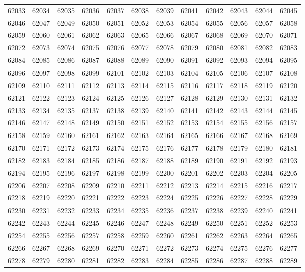 \begin{center}
\begin{longtable}{llllllllllll}
62033 &62034 &62035 &62036 &62037 &62038 &62039 &62041 &62042 &62043 &62044 &62045 \\
62046 &62047 &62049 &62050 &62051 &62052 &62053 &62054 &62055 &62056 &62057 &62058 \\
62059 &62060 &62061 &62062 &62063 &62065 &62066 &62067 &62068 &62069 &62070 &62071 \\
62072 &62073 &62074 &62075 &62076 &62077 &62078 &62079 &62080 &62081 &62082 &62083 \\
62084 &62085 &62086 &62087 &62088 &62089 &62090 &62091 &62092 &62093 &62094 &62095 \\
62096 &62097 &62098 &62099 &62101 &62102 &62103 &62104 &62105 &62106 &62107 &62108 \\
62109 &62110 &62111 &62112 &62113 &62114 &62115 &62116 &62117 &62118 &62119 &62120 \\
62121 &62122 &62123 &62124 &62125 &62126 &62127 &62128 &62129 &62130 &62131 &62132 \\
62133 &62134 &62135 &62137 &62138 &62139 &62140 &62141 &62142 &62143 &62144 &62145 \\
62146 &62147 &62148 &62149 &62150 &62151 &62152 &62153 &62154 &62155 &62156 &62157 \\
62158 &62159 &62160 &62161 &62162 &62163 &62164 &62165 &62166 &62167 &62168 &62169 \\
62170 &62171 &62172 &62173 &62174 &62175 &62176 &62177 &62178 &62179 &62180 &62181 \\
62182 &62183 &62184 &62185 &62186 &62187 &62188 &62189 &62190 &62191 &62192 &62193 \\
62194 &62195 &62196 &62197 &62198 &62199 &62200 &62201 &62202 &62203 &62204 &62205 \\
62206 &62207 &62208 &62209 &62210 &62211 &62212 &62213 &62214 &62215 &62216 &62217 \\
62218 &62219 &62220 &62221 &62222 &62223 &62224 &62225 &62226 &62227 &62228 &62229 \\
62230 &62231 &62232 &62233 &62234 &62235 &62236 &62237 &62238 &62239 &62240 &62241 \\
62242 &62243 &62244 &62245 &62246 &62247 &62248 &62249 &62250 &62251 &62252 &62253 \\
62254 &62255 &62256 &62257 &62258 &62259 &62260 &62261 &62262 &62263 &62264 &62265 \\
62266 &62267 &62268 &62269 &62270 &62271 &62272 &62273 &62274 &62275 &62276 &62277 \\
62278 &62279 &62280 &62281 &62282 &62283 &62284 &62285 &62286 &62287 &62288 &62289 \\

\end{longtable}
\end{center}
